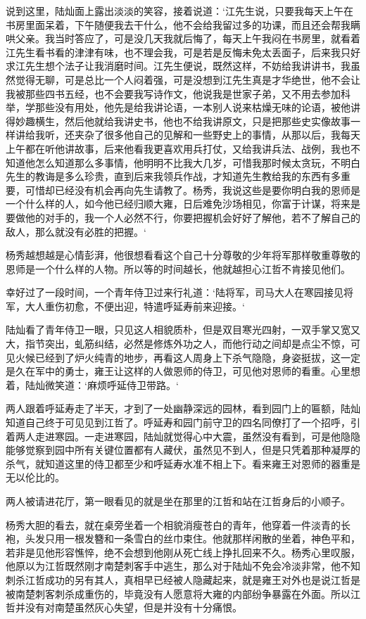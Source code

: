 说到这里，陆灿面上露出淡淡的笑容，接着说道：‘江先生说，只要我每天上午在书房里面呆着，下午随便我去干什么，他不会给我留过多的功课，而且还会帮我瞒哄父亲。我当时答应了，可是没几天我就后悔了，每天上午我闷在书房里，就看着江先生看书看的津津有味，也不理会我，可是若是反悔未免太丢面子，后来我只好求江先生想个法子让我消磨时间。江先生便说，既然这样，不妨给我讲讲书，我虽然觉得无聊，可是总比一个人闷着强，可是没想到江先生真是才华绝世，他不会让我被那些四书五经，也不会要我写诗作文，他说我是世家子弟，又不用去参加科举，学那些没有用处，他先是给我讲论语，一本别人说来枯燥无味的论语，被他讲得妙趣横生，然后他就给我讲史书，他也不给我讲原文，只是把那些史实像故事一样讲给我听，还夹杂了很多他自己的见解和一些野史上的事情，从那以后，我每天上午都在听他讲故事，后来他看我更喜欢用兵打仗，又给我讲兵法、战例，我也不知道他怎么知道那么多事情，他明明不比我大几岁，可惜我那时候太贪玩，不明白先生的教诲是多么珍贵，直到后来我领兵作战，才知道先生教给我的东西有多重要，可惜却已经没有机会再向先生请教了。杨秀，我说这些是要你明白我的恩师是一个什么样的人，如今他已经归顺大雍，日后难免沙场相见，你富于计谋，将来是要做他的对手的，我一个人必然不行，你要把握机会好好了解他，若不了解自己的敌人，那么就没有必胜的把握。‘

杨秀越想越是心情彭湃，他很想看看这个自己十分尊敬的少年将军那样敬重尊敬的恩师是一个什么样的人物。所以等的时间越长，他就越担心江哲不肯接见他们。

幸好过了一段时间，一个青年侍卫过来行礼道：‘陆将军，司马大人在寒园接见将军，大人重伤初愈，不便出迎，特遣呼延寿前来迎接。‘

陆灿看了青年侍卫一眼，只见这人相貌质朴，但是双目寒光四射，一双手掌又宽又大，指节突出，虬筋纠结，必然是修炼外功之人，而他行动之间却是点尘不惊，可见火候已经到了炉火纯青的地步，再看这人周身上下杀气隐隐，身姿挺拔，这一定是久在军中的勇士，雍王让这样的人做恩师的侍卫，可见他对恩师的看重。心里想着，陆灿微笑道：‘麻烦呼延侍卫带路。‘

两人跟着呼延寿走了半天，才到了一处幽静深远的园林，看到园门上的匾额，陆灿知道自己终于可见见到江哲了。呼延寿和园门前守卫的四名同僚打了一个招呼，引着两人走进寒园。一走进寒园，陆灿就觉得心中大震，虽然没有看到，可是他隐隐能够觉察到园中所有关键位置都有人藏伏，虽然见不到人，但是只凭着那种凝厚的杀气，就知道这里的侍卫都至少和呼延寿水准不相上下。看来雍王对恩师的器重是无以伦比的。

两人被请进花厅，第一眼看见的就是坐在那里的江哲和站在江哲身后的小顺子。

杨秀大胆的看去，就在桌旁坐着一个相貌消瘦苍白的青年，他穿着一件淡青的长袍，头发只用一根发簪和一条雪白的丝巾束住。他就那样闲散的坐着，神色平和，若非是见他形容憔悴，绝不会想到他刚从死亡线上挣扎回来不久。杨秀心里叹服，他原以为江哲既然刚才南楚刺客手中逃生，那么对于陆灿不免会冷淡非常，他不知刺杀江哲成功的另有其人，真相早已经被人隐藏起来，就是雍王对外也是说江哲是被南楚刺客刺杀成重伤的，毕竟没有人愿意将大雍的内部纷争暴露在外面。所以江哲并没有对南楚虽然灰心失望，但是并没有十分痛恨。

